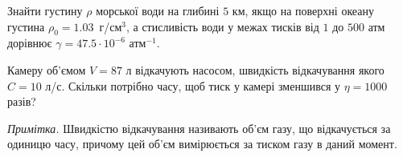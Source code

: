 \begin{problem}%
Знайти густину $\rho$ морської води на глибині $5$ км, якщо на поверхні океану густина $\rho_0 =
1.03$~г/см$^3$, а стисливість води у межах тисків від $1$ до $500$ атм дорівнює $\gamma = 47.5
\cdot 10^{-6}$ атм$^{-1}$.
\end{problem}


\begin{problem}%
Камеру об'ємом $V = 87$ л відкачують насосом, швидкість відкачування якого $C = 10$ л/с. Скільки
потрібно часу, щоб тиск у камері зменшився у $\eta = 1000$ разів?

\bigskip

\textit{Примітка.} Швидкістю відкачування називають об'єм газу, що відкачується за одиницю часу,
причому цей об'єм вимірюється за тиском газу в даний момент.
\end{problem}






